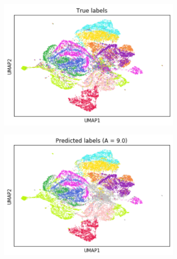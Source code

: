 \documentclass{article}
\begin{document}
\begin{figure}
    \centering
    \begin{subfigure}[t]{0.30\textwidth}
    \centering
        \includegraphics[width=\linewidth]{figs/notMNIST/notMNIST_labels.png} 
    \end{subfigure}
    \begin{subfigure}[t]{0.30\textwidth}
        \centering
        \includegraphics[width=\linewidth]{figs/notMNIST/notMNIST_preds_Aeq9.png} 
    \end{subfigure}
    \begin{subfigure}[t]{0.34\textwidth}
        \centering

\end{subfigure}
\end{figure}
\end{document}
